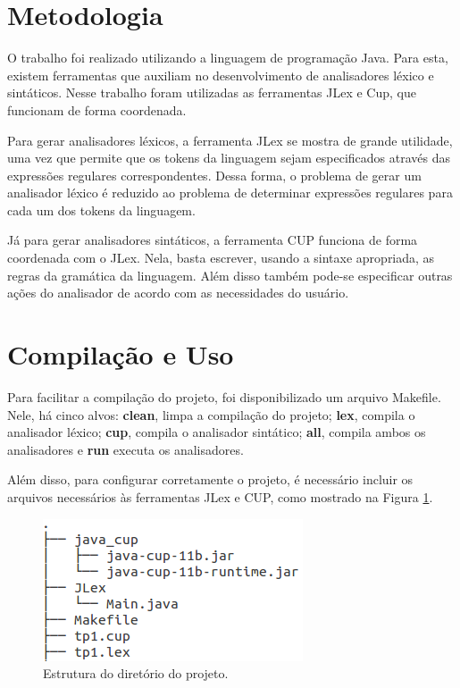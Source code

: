\documentclass[a4paper,12pt]{report}
\begin{document}
\section{Metodologia}

O trabalho foi realizado utilizando a linguagem de programação Java. Para esta,
existem ferramentas que auxiliam no desenvolvimento de analisadores léxico e
sintáticos. Nesse trabalho foram utilizadas as ferramentas JLex e Cup, que
funcionam de forma coordenada.

Para gerar analisadores léxicos, a ferramenta JLex se mostra de grande utilidade,
uma vez que permite que os tokens da linguagem sejam especificados através das 
expressões regulares correspondentes. Dessa forma, o problema de gerar um
analisador léxico é reduzido ao problema de determinar expressões regulares
para cada um dos tokens da linguagem.

Já para gerar analisadores sintáticos, a ferramenta CUP funciona de forma coordenada
com o JLex. Nela, basta escrever, usando a sintaxe apropriada, as regras da gramática
da linguagem. Além disso também pode-se especificar outras ações do analisador de acordo
com as necessidades do usuário.

\section{Compilação e Uso}

Para facilitar a compilação do projeto, foi disponibilizado um arquivo Makefile.
Nele, há cinco alvos: \textbf{clean}, limpa a compilação do projeto; \textbf{lex},
compila o analisador léxico; \textbf{cup}, compila o analisador sintático;
\textbf{all}, compila ambos os analisadores e \textbf{run} executa os analisadores.

Além disso, para configurar corretamente o projeto, é necessário incluir os arquivos
necessários às ferramentas JLex e CUP, como mostrado na Figura \ref{fig:folder}.

\begin{figure}[h]
 \centering
 \includegraphics[scale=0.7]{folder.png}
 \caption{Estrutura do diretório do projeto.}
 \label{fig:folder}
\end{figure}
\end{document}
